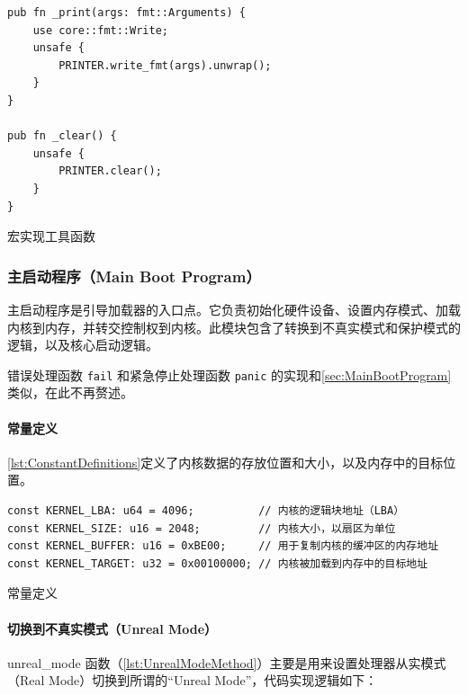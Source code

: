 \begin{listing}[htbp]
    \begin{verbatim}
pub fn _print(args: fmt::Arguments) {
    use core::fmt::Write;
    unsafe {
        PRINTER.write_fmt(args).unwrap();
    }
}

pub fn _clear() {
    unsafe {
        PRINTER.clear();
    }
}
    \end{verbatim}
    \caption{宏实现工具函数}\label{lst:MacroImplementationUtils}
\end{listing}

\subsubsection{主启动程序（Main Boot Program）}

主启动程序是引导加载器的入口点。它负责初始化硬件设备、设置内存模式、加载内核到内存，并转交控制权到内核。此模块包含了转换到不真实模式和保护模式的逻辑，以及核心启动逻辑。

错误处理函数 \texttt{fail} 和紧急停止处理函数 \texttt{panic} 的实现和\cref{sec:MainBootProgram}类似，在此不再赘述。

\paragraph{常量定义}

\cref{lst:ConstantDefinitions}定义了内核数据的存放位置和大小，以及内存中的目标位置。

\begin{listing}[htbp]
    \begin{verbatim}
const KERNEL_LBA: u64 = 4096;          // 内核的逻辑块地址（LBA）
const KERNEL_SIZE: u16 = 2048;         // 内核大小，以扇区为单位
const KERNEL_BUFFER: u16 = 0xBE00;     // 用于复制内核的缓冲区的内存地址
const KERNEL_TARGET: u32 = 0x00100000; // 内核被加载到内存中的目标地址
    \end{verbatim}
    \caption{常量定义}\label{lst:ConstantDefinitions}
\end{listing}

\paragraph{切换到不真实模式（Unreal Mode）}

unreal\_mode 函数（\cref{lst:UnrealModeMethod}）主要是用来设置处理器从实模式（Real Mode）切换到所谓的“Unreal Mode”，代码实现逻辑如下：

